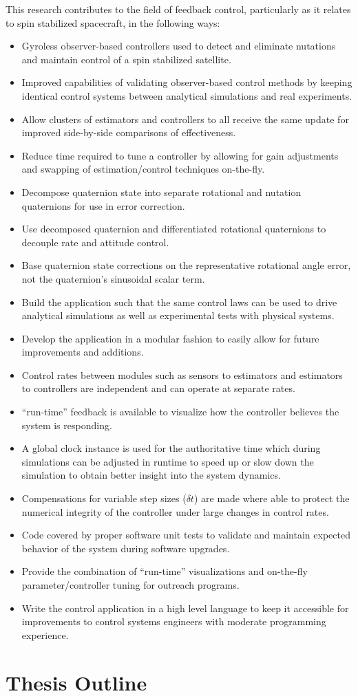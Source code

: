 This research contributes to the field of feedback control, particularly as it relates to spin stabilized spacecraft, in the following ways:

\begin{itemize}
\item Gyroless observer-based controllers used to detect and eliminate nutations and maintain control of a spin stabilized satellite.
\item Improved capabilities of validating observer-based control methods by keeping identical control systems between analytical simulations and real experiments.
\item Allow clusters of estimators and controllers to all receive the same update for improved side-by-side comparisons of effectiveness.
\item Reduce time required to tune a controller by allowing for gain adjustments and swapping of estimation/control techniques on-the-fly.
\item Decompose quaternion state into separate rotational and nutation quaternions for use in error correction.
\item Use decomposed quaternion and differentiated rotational quaternions to decouple rate and attitude control.
\item Base quaternion state corrections on the representative rotational angle error, not the quaternion's sinusoidal scalar term.
\item Build the application such that the same control laws can be used to drive analytical simulations as well as experimental tests with physical systems.
\item Develop the application in a modular fashion to easily allow for future improvements and additions.
\item Control rates between modules such as sensors to estimators and estimators to controllers are independent and can operate at separate rates.
\item ``run-time'' feedback is available to visualize how the controller believes the system is responding.
\item A global clock instance is used for the authoritative time which during simulations can be adjusted in runtime to speed up or slow down the simulation to obtain better insight into the system dynamics.
\item Compensations for variable step sizes ($\delta t$) are made where able to protect the numerical integrity of the controller under large changes in control rates.
\item Code covered by proper software unit tests to validate and maintain expected behavior of the system during software upgrades.
\item Provide the combination of ``run-time'' visualizations and on-the-fly parameter/controller tuning for outreach programs.
\item Write the control application in a high level language to keep it accessible for improvements to control systems engineers with moderate programming experience.
\end{itemize}

\section{Thesis Outline}
\label{sec:ThesisOutline}


